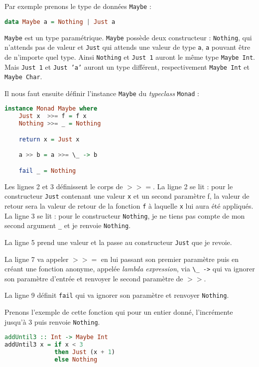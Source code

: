 \documentclass{llncs}
\begin{document}
Par exemple prenons le type de données \texttt{Maybe} :
\begin{lstlisting}[language=haskell]
data Maybe a = Nothing | Just a
\end{lstlisting}

\texttt{Maybe} est un type paramétrique.
\texttt{Maybe} possède deux constructeur : \texttt{Nothing}, qui n'attends pas
de valeur et \texttt{Just} qui attends une valeur de type \texttt{a}, \texttt{a}
pouvant être de n'importe quel type.
Ainsi \texttt{Nothing} et \texttt{Just 1} auront le même type \texttt{Maybe Int}.
Mais \texttt{Just 1} et \texttt{Just 'a'} auront un type différent, respectivement
\texttt{Maybe Int} et \texttt{Maybe Char}.

Il nous faut ensuite définir l'instance \texttt{Maybe} du \emph{typeclass}
\texttt{Monad} :
\begin{lstlisting}[language=haskell]
instance Monad Maybe where
    Just x  >>= f = f x
    Nothing >>= _ = Nothing

    return x = Just x

    a >> b = a >>= \_ -> b

    fail _ = Nothing
\end{lstlisting}

Les lignes 2 et 3 définissent le corps de $>>=$.
La ligne 2 se lit : pour le constructeur \texttt{Just} contenant une valeur
\texttt{x} et un second paramètre f, la valeur de retour sera la valeur de retour
de la fonction \texttt{f} à laquelle \texttt{x} lui aura été appliqués.
La ligne 3 se lit : pour le constructeur \texttt{Nothing}, je ne tiens pas compte
de mon second argument \texttt{\_} et je renvoie \texttt{Nothing}.

La ligne 5 prend une valeur et la passe au constructeur \texttt{Just} que je revoie.

La ligne 7 va appeler $>>=$ en lui passant son premier paramètre puis en créant
une fonction anonyme, appelée \emph{lambda expression}, via \texttt{\textbackslash\_ ->} qui
va ignorer son paramètre d'entrée et renvoyer le second paramètre de $>>$.

La ligne 9 définit \texttt{fail} qui va ignorer son paramètre et renvoyer \texttt{Nothing}.

Prenons l'exemple de cette fonction qui pour un entier donné, l'incrémente jusqu'à
3 puis renvoie \texttt{Nothing}.
\begin{lstlisting}[language=haskell]
addUntil3 :: Int -> Maybe Int
addUntil3 x = if x < 3
              then Just (x + 1)
              else Nothing
\end{lstlisting}
\end{document}
